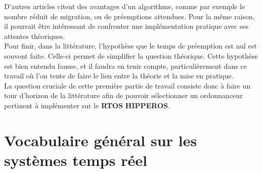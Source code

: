 \documentclass[11pt,a4paper,oneside]{report}
\begin{document}
 D'autres articles citent des avantages d'un algorithme, comme par exemple 
 le nombre réduit de migration, ou de préemptions attendues. Pour la même raison, 
 il pourrait être intéressant de confronter une implémentation pratique avec ses attentes 
 théoriques.\\

Pour finir, dans la littérature, l'hypothèse que le temps de préemption est nul 
est souvent faite. Celle-ci permet de simplifier la question théorique. 
Cette hypothèse est bien entendu fausse, et il faudra en tenir compte, 
particulièrement dans ce travail où l'on tente de faire 
le lien entre la théorie et la mise en pratique.\\
 
La question cruciale de cette première partie de travail 
consiste donc à faire un tour d'horizon de la littérature afin de pouvoir 
sélectionner un ordonnanceur pertinent à implémenter sur le \textbf{RTOS} \textbf{HIPPEROS}.

\section{Vocabulaire général sur les systèmes temps réel}
\end{document}
